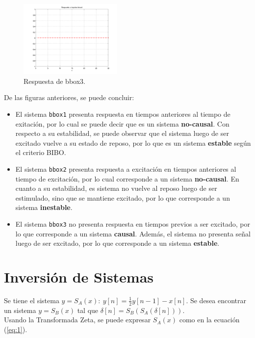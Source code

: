 \documentclass[10pt,conference,a4paper]{IEEEtran}
\begin{document}
\begin{figure}[H]
  \centering
  \includegraphics[width=0.45\textwidth]{../img/img9.png}
  \caption{Respuesta de bbox3.}
  \label{fig:img9}
\end{figure}

De las figuras anteriores, se puede concluir:

\begin{itemize}
 \item El sistema \verb|bbox1| presenta respuesta en tiempos anteriores al 
tiempo de exitaci\'on, por lo cual se puede decir que es un sistema 
\textbf{no-causal}. Con respecto a su estabilidad, se puede observar que el 
sistema luego de ser excitado vuelve a su estado de reposo, por lo que es un 
sistema \textbf{estable} seg\'un el criterio BIBO.
 \item El sistema \verb|bbox2| presenta respuesta a excitaci\'on en tiempos 
anteriores al tiempo de excitaci\'on, por lo cual corresponde a un sistema 
\textbf{no-causal}. En cuanto a su estabilidad, es sistema no vuelve al reposo 
luego de ser estimulado, sino que se mantiene excitado, por lo que corresponde 
a un sistema \textbf{inestable}.
 \item El sistema \verb|bbox3| no presenta respuesta en tiempos previos a ser 
excitado, por lo que corresponde a un sistema \textbf{causal}. Adem\'as, el 
sistema no presenta se\~nal luego de ser excitado, por lo que corresponde a un 
sistema \textbf{estable}.
\end{itemize}

\section{Inversi\'on de Sistemas}

Se tiene el sistema $y=S_A(x):\ y[n]=\frac{1}{2}y[n-1]-x[n]$. Se desea 
encontrar un sistema $y=S_B(x)$ tal que $\delta[n]=S_B(S_A(\delta[n]))$.\\

Usando la Transformada Zeta, se puede expresar $S_A(x)$ como en la ecuaci\'on 
(\ref{eq:1}).
\end{document}
